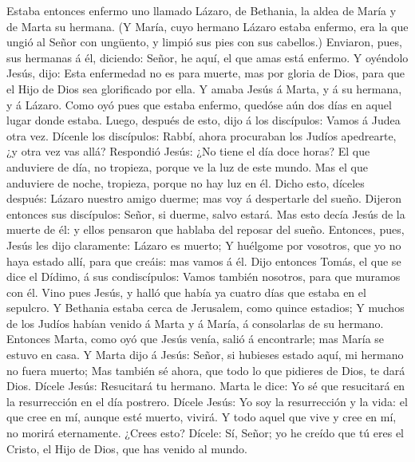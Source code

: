  Estaba entonces enfermo uno llamado Lázaro, de Bethania, la
aldea de María y de Marta su hermana.  (Y María, cuyo
hermano Lázaro estaba enfermo, era la que ungió al Señor con ungüento, y
limpió sus pies con sus cabellos.)  Enviaron, pues, sus
hermanas á él, diciendo: Señor, he aquí, el que amas está enfermo.
 Y oyéndolo Jesús, dijo: Esta enfermedad no es para muerte,
mas por gloria de Dios, para que el Hijo de Dios sea glorificado por
ella.  Y amaba Jesús á Marta, y á su hermana, y á Lázaro.
 Como oyó pues que estaba enfermo, quedóse aún dos días en
aquel lugar donde estaba.  Luego, después de esto, dijo á
los discípulos: Vamos á Judea otra vez.  Dícenle los
discípulos: Rabbí, ahora procuraban los Judíos apedrearte, ¿y otra vez
vas allá?  Respondió Jesús: ¿No tiene el día doce horas? El
que anduviere de día, no tropieza, porque ve la luz de este mundo.
 Mas el que anduviere de noche, tropieza, porque no hay luz
en él.  Dicho esto, díceles después: Lázaro nuestro amigo
duerme; mas voy á despertarle del sueño.  Dijeron entonces
sus discípulos: Señor, si duerme, salvo estará.  Mas esto
decía Jesús de la muerte de él: y ellos pensaron que hablaba del reposar
del sueño.  Entonces, pues, Jesús les dijo claramente:
Lázaro es muerto;  Y huélgome por vosotros, que yo no haya
estado allí, para que creáis: mas vamos á él.  Dijo
entonces Tomás, el que se dice el Dídimo, á sus condiscípulos: Vamos
también nosotros, para que muramos con él.  Vino pues
Jesús, y halló que había ya cuatro días que estaba en el sepulcro.
 Y Bethania estaba cerca de Jerusalem, como quince
estadios;  Y muchos de los Judíos habían venido á Marta y á
María, á consolarlas de su hermano.  Entonces Marta, como
oyó que Jesús venía, salió á encontrarle; mas María se estuvo en casa.
 Y Marta dijo á Jesús: Señor, si hubieses estado aquí, mi
hermano no fuera muerto;  Mas también sé ahora, que todo lo
que pidieres de Dios, te dará Dios.  Dícele Jesús:
Resucitará tu hermano.  Marta le dice: Yo sé que resucitará
en la resurrección en el día postrero.  Dícele Jesús: Yo
soy la resurrección y la vida: el que cree en mí, aunque esté muerto,
vivirá.  Y todo aquel que vive y cree en mí, no morirá
eternamente. ¿Crees esto?  Dícele: Sí, Señor; yo he creído
que tú eres el Cristo, el Hijo de Dios, que has venido al mundo.
